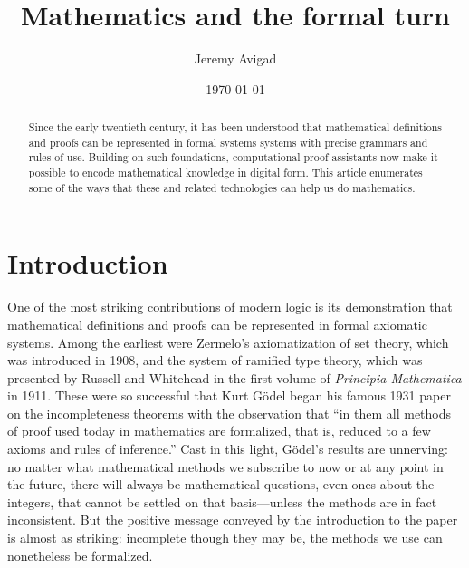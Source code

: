 \documentclass{amsart}
\theoremstyle{definition}
\theoremstyle{remark}
\numberwithin{equation}{section}
\begin{document}
\title{Mathematics and the formal turn}

\author{Jeremy Avigad}
\address{Department of Philosophy and Department of Mathematical Sciences, Baker Hall 161, Carnegie Mellon University, Pittsburgh, PA 15213, USA}
\curraddr{}


\date{\today}


\begin{abstract}
Since the early twentieth century, it has been understood that mathematical definitions and proofs can be represented in formal systems systems with precise grammars and rules of use. Building on such foundations, computational proof assistants now make it possible to encode mathematical knowledge in digital form. This article enumerates some of the ways that these and related technologies can help us do mathematics.
\end{abstract}

\maketitle

\section*{Introduction}

One of the most striking contributions of modern logic is its demonstration that mathematical definitions and proofs can be represented in formal axiomatic systems. Among the earliest were Zermelo's axiomatization of set theory, which was introduced in 1908, and the system of ramified type theory, which was presented by Russell and Whitehead in the first volume of \emph{Principia Mathematica} in 1911. These were so successful that Kurt G\"odel began his famous 1931 paper on the incompleteness theorems with the observation that ``in them all methods of proof used today in mathematics are formalized, that is, reduced to a few axioms and rules of inference.'' Cast in this light, G\"odel's results are unnerving: no matter what mathematical methods we subscribe to now or at any point in the future, there will always be mathematical questions, even ones about the integers, that cannot be settled on that basis---unless the methods are in fact inconsistent. But the positive message conveyed by the introduction to the paper is almost as striking: incomplete though they may be, the methods we use can nonetheless be formalized.
\end{document}

